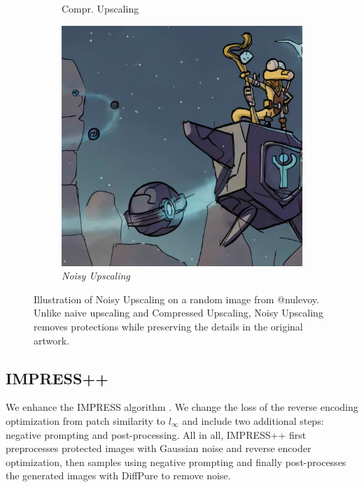 \documentclass{article}
\begin{document}
\begin{figure}[h]
\begin{subfigure}[b]{0.195\textwidth}
         \caption{Compr. Upscaling}
     \end{subfigure}
     \begin{subfigure}[b]{0.195\textwidth}
         \centering
         \includegraphics[width=\textwidth]{plots/noisyups/0001_nulevoy_upscaled_noisy.jpg}
         \caption{\emph{Noisy Upscaling}}
     \end{subfigure}
    \caption{Illustration of Noisy Upscaling on a random image from @nulevoy. Unlike naive upscaling and Compressed Upscaling, Noisy Upscaling removes protections while preserving the details in the original artwork.}
    \label{fig:noisyups}
\end{figure}


\subsection{IMPRESS++}
\label{ap:impressplus}

We enhance the IMPRESS algorithm \citep{impress}. We change the loss of the reverse encoding optimization from patch similarity to $l_\infty$ and include two additional steps: negative prompting and post-processing. All in all, IMPRESS++ first preprocesses protected images with Gaussian noise and reverse encoder optimization, then samples using negative prompting and finally post-processes the generated images with DiffPure to remove noise.
\end{document}
